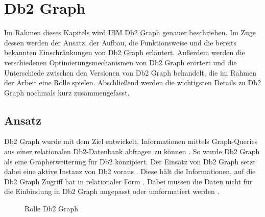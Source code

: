 \section{Db2 Graph}
\label{db2graph}

Im Rahmen dieses Kapitels wird IBM Db2 Graph genauer beschrieben. Im Zuge dessen werden der Ansatz, der Aufbau, die Funktionsweise und die bereits bekannten Einschränkungen von Db2 Graph erläutert. Außerdem werden die verschiedenen Optimierungsmechanismen von Db2 Graph erörtert und die Unterschiede zwischen den Versionen von Db2 Graph behandelt, die im Rahmen der Arbeit eine Rolle spielen. Abschließend werden die wichtigsten Details zu Db2 Graph nochmals kurz zusammengefasst.

\subsection{Ansatz}
\label{db2graph:ansatz}
Db2 Graph wurde mit dem Ziel entwickelt, Informationen mittels Graph-Queries aus einer relationalen Db2-Datenbank abfragen zu können \cite{vldb_tian, sigmod_tian}. So wurde Db2 Graph als eine Grapherweiterung für Db2 konzipiert. Der Einsatz von Db2 Graph setzt dabei eine aktive Instanz von Db2 voraus \cite{vldb_tian, sigmod_tian}. Diese hält die Informationen, auf die Db2 Graph Zugriff hat in relationaler Form \cite{vldb_tian, sigmod_tian}. Dabei müssen die Daten nicht für die Einbindung in Db2 Graph angepasst oder umformatiert werden \cite{vldb_tian, sigmod_tian}.

\begin{figure}[!ht]
	\usetikzlibrary{shapes.arrows}
    \centering
    \vspace{0.1em}
    \caption{Rolle Db2 Graph}
    \label{fig:db2graph_system}
\end{figure}


